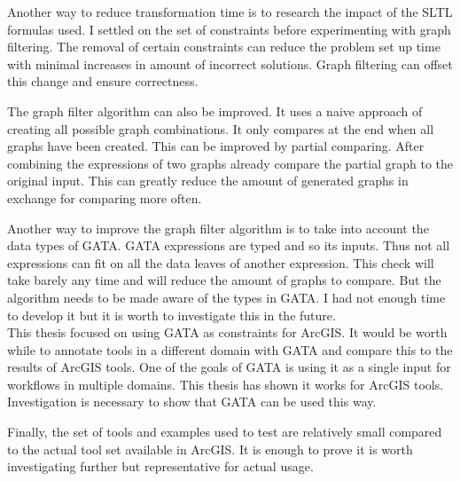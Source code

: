 \documentclass{article}
\begin{document}
Another way to reduce transformation time is to research the impact of the SLTL formulas used. I settled on the set of constraints before experimenting with graph filtering. The removal of certain constraints can reduce the problem set up time with minimal increases in amount of incorrect solutions. Graph filtering can offset this change and ensure correctness. 

The graph filter algorithm can also be improved. It uses a naive approach of creating all possible graph combinations. It only compares at the end when all graphs have been created. This can be improved by partial comparing. After combining the expressions of two graphs already compare the partial graph to the original input. This can greatly reduce the amount of generated graphs in exchange for comparing more often. 

Another way to improve the graph filter algorithm is to take into account the data types of GATA. GATA expressions are typed and so its inputs. Thus not all expressions can fit on all the data leaves of another expression. This check will take barely any time and will reduce the amount of graphs to compare. But the algorithm needs to be made aware of the types in GATA. I had not enough time to develop it but it is worth to investigate this in the future.\\


This thesis focused on using GATA as constraints for ArcGIS. It would be worth while to annotate tools in a different domain with GATA and compare this to the results of ArcGIS tools. One of the goals of GATA is using it as a single input for workflows in multiple domains. This thesis has shown it works for ArcGIS tools. Investigation is necessary to show that GATA can be used this way. 

Finally, the set of tools and examples used to test are relatively small compared to the actual tool set available in ArcGIS. It is enough to prove it is worth investigating further but representative for actual usage.   




\end{document}
